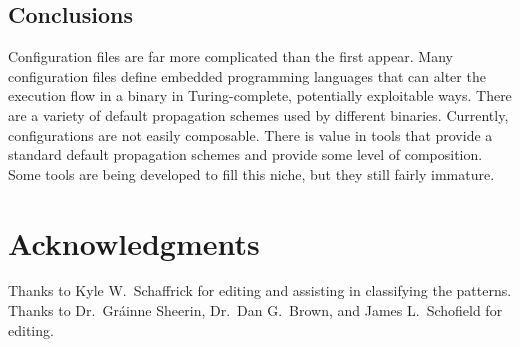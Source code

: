 \documentclass[letterpaper,twocolumn,10pt]{article}
\begin{document}
\subsection{Conclusions}

Configuration files are far more complicated than the first appear. Many configuration files define embedded programming languages that can alter the execution flow in a binary in Turing-complete, potentially exploitable ways. There are a variety of default propagation schemes used by different binaries. Currently, configurations are not easily composable. There is value in tools that provide a standard default propagation schemes and provide some level of composition. Some tools are being developed to fill this niche, but they still fairly immature.

\section{Acknowledgments}
Thanks to Kyle W.~Schaffrick for editing and assisting in classifying the patterns. Thanks to Dr.~Gr\'ainne Sheerin, Dr.~Dan G.~Brown, and James L.~Schofield for editing.

{\footnotesize 
}

\theendnotes
\end{document}
